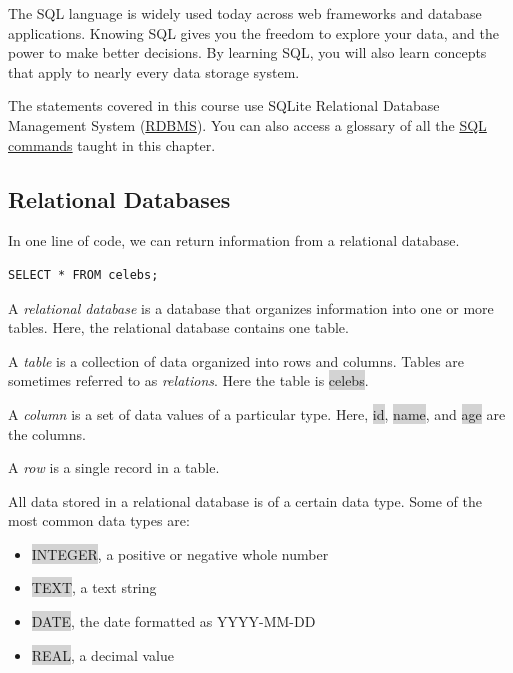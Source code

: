\documentclass[11pt]{article}
\begin{document}
The SQL language is widely used today across web frameworks and database applications. Knowing SQL gives you the freedom to explore your data, and the power to make better decisions. By learning SQL, you will also learn concepts that apply to nearly every data storage system.

The statements covered in this course use SQLite Relational Database Management System (\href{https://www.codecademy.com/articles/what-is-rdbms-sql}{RDBMS}). You can also access a glossary of all the \href{https://www.codecademy.com/articles/sql-commands}{SQL commands} taught in this chapter.

\subsection{Relational Databases}
In one line of code, we can return information from a relational database.
\begin{lstlisting}
SELECT * FROM celebs;
\end{lstlisting}
A \textit{relational database} is a database that organizes information into one or more tables. Here, the relational database contains one table.

A \textit{table} is a collection of data organized into rows and columns. Tables are sometimes referred to as \textit{relations}. Here the table is \colorbox{lightgray}{celebs}.

A \textit{column} is a set of data values of a particular type. Here, \colorbox{lightgray}{id}, \colorbox{lightgray}{name}, and \colorbox{lightgray}{age} are the columns.

A \textit{row} is a single record in a table. 

All data stored in a relational database is of a certain data type. Some of the most common data types are:
\begin{itemize}[leftmargin = *]
\item \colorbox{lightgray}{INTEGER}, a positive or negative whole number
\item \colorbox{lightgray}{TEXT}, a text string
\item \colorbox{lightgray}{DATE}, the date formatted as YYYY-MM-DD
\item \colorbox{lightgray}{REAL}, a decimal value
\end{itemize}
\end{document}
